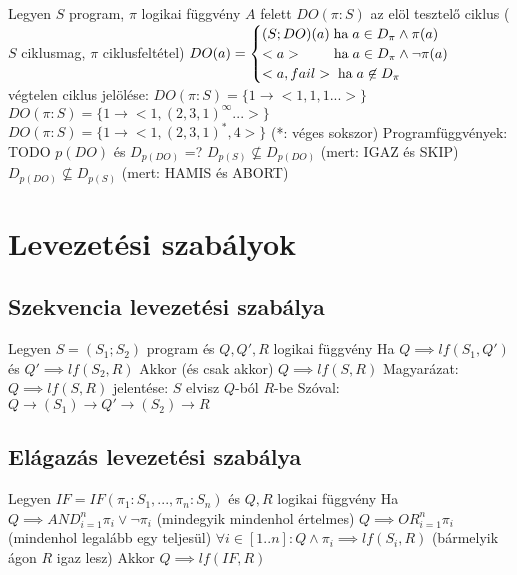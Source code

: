 \documentclass[12pt,a4paper]{article}
\begin{document}
\begin{outline}
	\1 Legyen $S$ program, $\pi$ logikai függvény $A$ felett
	\1 $DO(\pi:S)$ az elöl tesztelő ciklus ($S$ ciklusmag, $\pi$ ciklusfeltétel)
		\2 $DO(a)=\begin{cases}
			(S;DO)(a) \text{\;ha\;} a \in D_\pi \wedge \pi(a)\\
			<a> \;\;\;\;\;\;\; \text{\;ha\;} a \in D_\pi \wedge \lnot \pi(a)\\
			<a,fail> \text{\;ha\;} a \not \in D_\pi
			\end{cases}$
		\2 végtelen ciklus jelölése:
			\3 $DO(\pi:S)=\{1 \to <1,1,1...>\}$
			\3 $DO(\pi:S)=\{1 \to <1,(2,3,1)^{\infty}...>\}$
			\3 $DO(\pi:S)=\{1 \to <1,(2,3,1)^*,4>\}$ (*: véges sokszor)
	\1 Programfüggvények:
		\2 TODO $p(DO)$ és $D_{p(DO)}$ =?
		\2 $D_{p(S)} \not \subseteq D_{p(DO)}$ (mert: IGAZ és SKIP)
		\2 $D_{p(DO)} \not \subseteq D_{p(S)}$ (mert: HAMIS és ABORT)
\end{outline}

\pagebreak

\section{Levezetési szabályok}

\subsection{Szekvencia levezetési szabálya}

\begin{outline}
	\1 Legyen $S=(S_1;S_2)$ program és $Q,Q',R$ logikai függvény
	\1 Ha $Q \implies lf(S_1,Q')$ és $Q' \implies lf(S_2,R)$
	\1 Akkor (és csak akkor) $Q \implies lf(S,R)$
	\1 Magyarázat: $Q \implies lf(S,R)$ jelentése: $S$ elvisz $Q$-ból $R$-be
		\2 Szóval: $Q \to (S_1) \to Q' \to (S_2) \to R$
\end{outline}

\subsection{Elágazás levezetési szabálya}

\begin{outline}
	\1 Legyen $IF=IF(\pi_1:S_1,...,\pi_n:S_n)$ és $Q,R$ logikai függvény 
	\1 Ha
		\2 $Q \implies AND_{i=1}^{n} \pi_i \lor \lnot \pi_i$ \;\; (mindegyik mindenhol értelmes)
		\2 $Q \implies OR_{i=1}^{n} \pi_i$ \;\; (mindenhol legalább egy teljesül)
		\2 $\forall i \in [1..n]: Q \wedge \pi_i \implies lf(S_i,R)$ \;\; (bármelyik ágon $R$ igaz lesz)
	\1 Akkor $Q \implies lf(IF,R)$
\end{outline}
\end{document}
